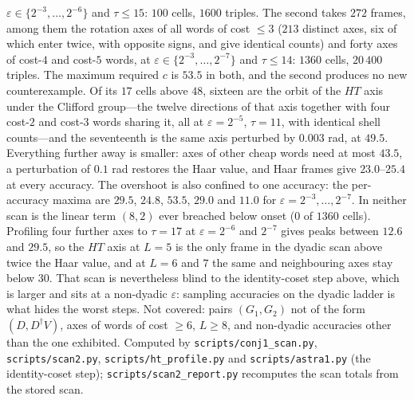 \documentclass[aps,prx,twocolumn,superscriptaddress,nofootinbib,longbibliography]{revtex4-2}
\theoremstyle{plain}
\theoremstyle{definition}
\theoremstyle{remark}
\begin{document}
$\varepsilon\in\{2^{-3},\dots,2^{-6}\}$ and $\tau\le15$: $100$ cells, $1600$ triples. The second takes $272$ frames, among them the rotation axes of all words of cost $\le3$ ($213$ distinct axes, six of which enter twice, with opposite signs, and give identical counts) and forty axes of cost-$4$ and cost-$5$ words, at $\varepsilon\in\{2^{-3},\dots,2^{-7}\}$ and $\tau\le14$: $1360$ cells, $20\,400$ triples. The maximum required $c$ is $53.5$ in both, and the second produces no new counterexample. Of its $17$ cells above $48$, sixteen are the orbit of the $HT$ axis under the Clifford group---the twelve directions of that axis together with four cost-$2$ and cost-$3$ words sharing it, all at $\varepsilon=2^{-5}$, $\tau=11$, with identical shell counts---and the seventeenth is the same axis perturbed by $0.003$ rad, at $49.5$. Everything further away is smaller: axes of other cheap words need at most $43.5$, a perturbation of $0.1$ rad restores the Haar value, and Haar frames give $23.0$--$25.4$ at every accuracy. The overshoot is also confined to one accuracy: the per-accuracy maxima are $29.5$, $24.8$, $\mathbf{53.5}$, $29.0$ and $11.0$ for $\varepsilon=2^{-3},\dots,2^{-7}$. In neither scan is the linear term $(8,2)$ ever breached below onset ($0$ of $1360$ cells). Profiling four further axes to $\tau=17$ at $\varepsilon=2^{-6}$ and $2^{-7}$ gives peaks between $12.6$ and $29.5$, so the $HT$ axis at $L=5$ is the only frame in the dyadic scan above twice the Haar value, and at $L=6$ and $7$ the same and neighbouring axes stay below $30$. That scan is nevertheless blind to the identity-coset step above, which is larger and sits at a non-dyadic $\varepsilon$: sampling accuracies on the dyadic ladder is what hides the worst steps. Not covered: pairs $(G_1,G_2)$ not of the form $(D,D^\dagger V)$, axes of words of cost $\ge6$, $L\ge8$, and non-dyadic accuracies other than the one exhibited. Computed by \texttt{scripts/conj1\_scan.py}, \texttt{scripts/scan2.py}, \texttt{scripts/ht\_profile.py} and \texttt{scripts/astra1.py} (the identity-coset step); \texttt{scripts/scan2\_report.py} recomputes the scan totals from the stored scan.
\end{document}
